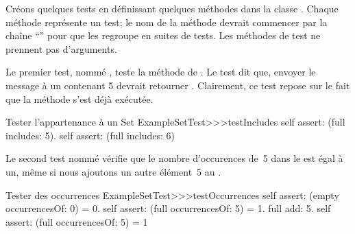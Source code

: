\documentclass[a4paper,10pt,twoside]{book}
\begin{document}
Créons quelques tests en définissant quelques méthodes dans la classe .
Chaque méthode représente un test;
le nom de la méthode devrait commencer par la chaîne ``'' pour que \sunit les 
regroupe en suites de tests.
Les méthodes de test ne prennent pas d'arguments.


Le premier test, nommé , teste la méthode  de . 
Le test dit que, envoyer le message  à un  contenant 5 devrait 
retourner . Clairement, ce test repose sur le fait que la méthode  
s'est déjà exécutée.


\begin{method}[testIncludes]{Tester l'appartenance à un Set}
ExampleSetTest>>>testIncludes
	self assert: (full includes: 5).
	self assert: (full includes: 6)
\end{method}

Le second test nommé  vérifie que le nombre d'occurences de~5 dans 
le   est égal à un, même si nous ajoutons un autre élément~5 au .

\begin{method}[testOccurrences]{Tester des occurrences}
ExampleSetTest>>>testOccurrences
	self assert: (empty occurrencesOf: 0) = 0.
	self assert: (full occurrencesOf: 5) = 1.
	full add: 5.
	self assert: (full occurrencesOf: 5) = 1
\end{method}
\end{document}
